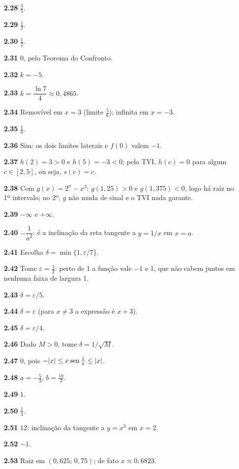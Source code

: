 {\begin{multicols}{2}
\begin{itemize}[leftmargin=2.7em,labelsep=0.5em,itemsep=1pt]
\item[\textbf{2.28}] $\tfrac35$.
\item[\textbf{2.29}] $\tfrac12$.
\item[\textbf{2.30}] $\tfrac12$.
\item[\textbf{2.31}] 0, pelo Teorema do Confronto.
\item[\textbf{2.32}] $k=-5$.
\item[\textbf{2.33}] $k=\dfrac{\ln7}{4}\approx0{,}4865$.
\item[\textbf{2.34}] Removível em $x=3$ (limite $\tfrac56$); infinita em $x=-3$.
\item[\textbf{2.35}] $\tfrac16$.
\item[\textbf{2.36}] Sim: os dois limites laterais e $f(0)$ valem $-1$.
\item[\textbf{2.37}] $h(2)=3>0$ e $h(5)=-3<0$; pelo TVI, $h(c)=0$ para algum $c\in[2,5]$, ou seja, $s(c)=c$.
\item[\textbf{2.38}] Com $g(x)=2^x-x^3$: $g(1{,}25)>0$ e $g(1{,}375)<0$, logo há raiz no 1º intervalo; no 2º, $g$ não muda de sinal e o TVI nada garante.
\item[\textbf{2.39}] $-\infty$ e $+\infty$.
\item[\textbf{2.40}] $-\dfrac{1}{a^2}$: é a inclinação da reta tangente a $y=1/x$ em $x=a$.
\item[\textbf{2.41}] Escolha $\delta=\min\{1,\varepsilon/7\}$.
\item[\textbf{2.42}] Tome $\varepsilon=\tfrac12$: perto de 1 a função vale $-1$ e $1$, que não cabem juntos em nenhuma faixa de largura 1.
\item[\textbf{2.43}] $\delta=\varepsilon/5$.
\item[\textbf{2.44}] $\delta=\varepsilon$ (para $x\neq3$ a expressão é $x+3$).
\item[\textbf{2.45}] $\delta=\varepsilon/4$.
\item[\textbf{2.46}] Dado $M>0$, tome $\delta=1/\sqrt M$.
\item[\textbf{2.47}] $0$, pois $-|x|\le x\operatorname{sen}\tfrac1x\le|x|$.
\item[\textbf{2.48}] $a=-\tfrac53$, $b=\tfrac{10}3$.
\item[\textbf{2.49}] $1$.
\item[\textbf{2.50}] $\tfrac13$.
\item[\textbf{2.51}] $12$: inclinação da tangente a $y=x^3$ em $x=2$.
\item[\textbf{2.52}] $-1$.
\item[\textbf{2.53}] Raiz em $(0{,}625;\,0{,}75)$; de fato $x\approx0{,}6823$.

\end{itemize}
\end{multicols}}
